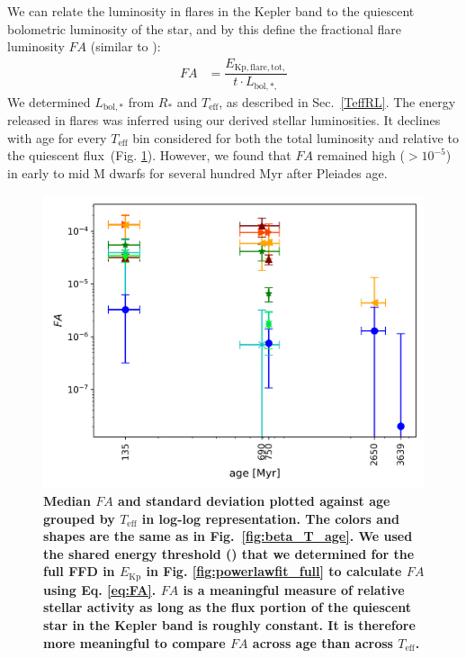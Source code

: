 \documentclass{aa}
\begin{document}
We can relate the luminosity in flares in the Kepler band to the quiescent bolometric luminosity of the star, and by this define the fractional flare luminosity $FA$ (similar to ):
\begin{align}
\label{eq:FA}
FA&=\dfrac{E_\mathrm{Kp,flare,tot,}}{t\cdot L_{\mathrm{bol,*,}}}
\end{align}
We determined $L_\mathrm{bol,*}$ from $R_*$ and $T_\mathrm{eff}$, as described in Sec.~\ref{TeffRL}. The energy released in flares was inferred using our derived stellar luminosities. It declines with age for every $T_\mathrm{eff}$ bin considered for both the total luminosity and relative to the quiescent flux~(Fig. \ref{fig:FA}). However, we found that $FA$ remained high ($>10^{-5}$) in early to mid M dwarfs for several hundred Myr after Pleiades age.
\begin{figure}[ht!]
    \centering
    \includegraphics[width=\hsize]{pics/FA/FA_T_age_Ethresh.png}
    \caption{\textbf{Median $FA$ and standard deviation plotted against age grouped by $T_\mathrm{eff}$ in log-log representation. The colors and shapes are the same as in Fig.~\ref{fig:beta_T_age}. We used the shared energy threshold (\unskip) that we determined for the full FFD in $E_\mathrm{Kp}$ in Fig. \ref{fig:powerlawfit_full} to calculate $FA$ using Eq. \ref{eq:FA}. $FA$ is a meaningful measure of relative stellar activity as long as the flux portion of the quiescent star in the Kepler band is roughly constant. It is therefore more meaningful to compare $FA$ across age than across $T_\mathrm{eff}$.}}          
    \label{fig:FA}
\end{figure}
\end{document}
